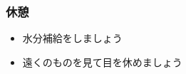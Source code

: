 \documentclass[dvipdfmx]{beamer}
\begin{document}
\begin{frame}[fragile]
	\frametitle{休憩~~~}
	\huge
      \begin{itemize}
           \item 水分補給をしましょう
           \item 遠くのものを見て目を休めましょう
     \end{itemize}
\end{frame}
\end{document}
